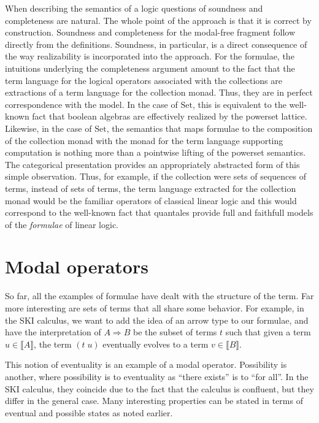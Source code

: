 \documentclass{llncs}
\newcommand{\interp}[1]{\llbracket #1 \rrbracket}
\newcommand{\Set}{\mathrm{Set}}
\begin{document}
When describing the semantics of a logic questions of soundness and
completeness are natural. The whole point of the approach is that it
is correct by construction. Soundness and completeness for the
modal-free fragment follow directly from the definitions. Soundness,
in particular, is a direct consequence of the way realizability is
incorporated into the approach. For the formulae, the intuitions
underlying the completeness argument amount to the fact that the term
language for the logical operators associated with the collections are
extractions of a term language for the collection monad. Thus, they
are in perfect correspondence with the model. In the case of $\Set$,
this is equivalent to the well-known fact that boolean algebras are
effectively realized by the powerset lattice. Likewise, in the case of
$\Set$, the semantics that maps formulae to the composition of the
collection monad with the monad for the term language supporting
computation is nothing more than a pointwise lifting of the powerset
semantics. The categorical presentation provides an appropriately
abstracted form of this simple observation. Thus, for example, if the
collection were sets of sequences of terms, instead of sets of terms,
the term language extracted for the collection monad would be the
familiar operators of classical linear logic and this would correspond
to the well-known fact that quantales provide full and faithfull
models of the \emph{formulae} of linear logic.

\section{Modal operators}

So far, all the examples of formulae have dealt with the structure of the term.  Far more interesting are sets of terms that all share some behavior.  For example, in the SKI calculus, we want to add the idea of an arrow type to our formulae, and have the interpretation of $A \Rightarrow B$ be the subset of terms $t$ such that given a term $u\in\interp{A}$, the term $(t\; u)$ eventually evolves to a term $v\in\interp{B}.$

This notion of eventuality is an example of a modal operator.  Possibility is another, where possibility is to eventuality as ``there exists'' is to ``for all''.  In the SKI calculus, they coincide due to the fact that the calculus is confluent, but they differ in the general case. Many interesting properties can be stated in terms of eventual and possible states as noted earlier.
\end{document}
